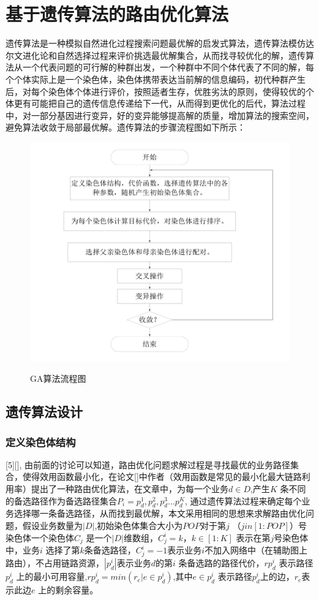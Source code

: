 \section{基于遗传算法的路由优化算法}
	遗传算法是一种模拟自然进化过程搜索问题最优解的启发式算法，遗传算法模仿达尔文进化论和自然选择过程来评价挑选最优解集合，从而找寻较优化的解，遗传算法从一个代表问题的可行解的种群出发，一个种群中不同个体代表了不同的解，每个个体实际上是一个染色体，染色体携带表达当前解的信息编码，初代种群产生后，对每个染色体个体进行评价，按照适者生存，优胜劣汰的原则，使得较优的个体更有可能把自己的遗传信息传递给下一代，从而得到更优化的后代，算法过程中，对一部分基因进行变异，好的变异能够提高解的质量，增加算法的搜索空间，避免算法收敛于局部最优解。遗传算法的步骤流程图如下所示：
\begin{figure}
\setlength{\belowcaptionskip}{-0.5cm}
  \begin{center}
    {\includegraphics[width=0.45 \textwidth]{figures/GAprocess.pdf}}
    \end{center}
  \caption{{\footnotesize{GA算法流程图}}}
  \label{IterNum}
\end{figure}
\subsection{遗传算法设计}
\subsubsection{定义染色体结构}
[5][],
由前面的讨论可以知道，路由优化问题求解过程是寻找最优的业务路径集合，使得效用函数最小化，在论文[]中作者（效用函数是常见的最小化最大链路利用率）提出了一种路由优化算法，在文章中，为每一个业务$d \in D$,产生$K$ 条不同的备选路径作为备选路径集合$P_i={p^1_d,p^2_d,p^3_d...p^K_d}$, 通过遗传算法过程来确定每个业务选择哪一条备选路径，从而找到最优解，本文采用相同的思想来求解路由优化问题，假设业务数量为$|D|$,初始染色体集合大小为$POP$对于第$j$ （$j in [1:POP]$）号染色体一个染色体$C_j$ 是一个$|D|$维数组，$C^i_j=k，k \in[1:K]$ 表示在第$j$号染色体中，业务$i$ 选择了第$k$条备选路径，$C^i_j=-1$表示业务$i$不加入网络中（在辅助图上路由），不占用链路资源，$|p^i_d|$表示业务$d$的第$i$ 条备选路的路径代价，$rp^i_d$ 表示路径$p^i_d$ 上的最小可用容量,$rp^i_d=min(r_e|e \in p^i_d)$,其中$e \in p^i_d$ 表示路径$p^i_d$上的边，$r_e$表示此边$e$ 上的剩余容量。
